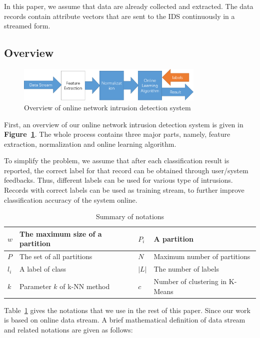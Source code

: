 \documentclass[runningheads]{llncs}
\begin{document}
	In this paper, we assume that data are already collected and extracted. The data records contain attribute vectors that are sent to the IDS continuously in a streamed form.

	\subsection{Overview}
	
	\begin{figure}
		\centering
		\includegraphics[width=0.8\textwidth]{overview}
		\caption{Overview of online network intrusion detection system}
		\label{fig:overview}
	\end{figure}
	
	First, an overview of our online network intrusion detection system is given in \textbf{Figure~\ref{fig:overview}}. The whole process contains three major parts, namely, feature extraction, normalization and online learning algorithm.
	
	To simplify the problem, we assume that after each classification result is reported, the correct label for that record can be obtained through user/system feedbacks. Thus, different labels can be used for various type of intrusions. Records with correct labels can be used as training stream, to further improve classification accuracy of the system online.
	
	\begin{table}
		\centering
		\caption{Summary of notations}\label{table:notation}
		\begin{tabular}{|m{1em}|m{16em}|m{1em}|m{16em}|}
			\hline
			$w$ & The maximum size of a partition & $P_i$ & A partition \\ 
			\hline
			$P$ & The set of all partitions & $N$ & Maximum number of partitions \\ 
			\hline
			$l_i$ & A label of class & $|L|$ & The number of labels  \\ 
			\hline
			$k$ & Parameter $k$ of k-NN method & $c$ & Number of clustering in K-Means \\
			\hline
		\end{tabular}
	\end{table}
	
	Table~\ref{table:notation} gives the notations that we use in the rest of this paper. Since our work is based on online data stream. A brief mathematical definition of data stream and related notations are given as follows:
	
\end{document}
